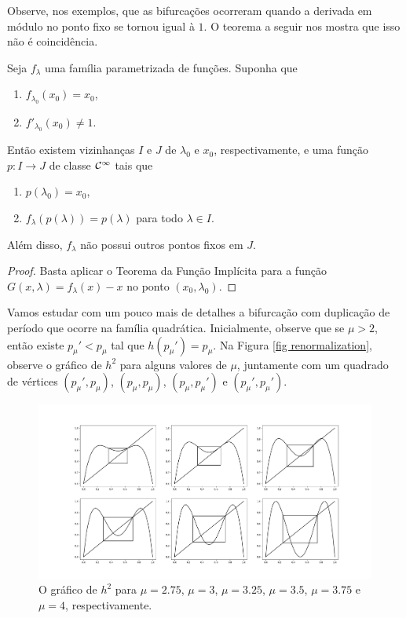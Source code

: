 Observe, nos exemplos, que as bifurcações ocorreram quando a derivada em módulo no ponto fixo se tornou igual à $1$. O teorema a seguir nos mostra que isso não é coincidência.

\begin{theorem}
\label{theorem1}
Seja $f_\lambda$ uma família parametrizada de funções.
Suponha que
\begin{enumerate}
\item $f_{\lambda_0}(x_0) = x_0$,
\item $f'_{\lambda_0}(x_0) \neq 1$. 
\end{enumerate}
Então existem vizinhanças $I$ e $J$ de $\lambda_0$ e $x_0$, respectivamente, e uma função $p: I \to J$ de classe $\mathcal{C}^\infty$ tais que
\begin{enumerate}
\item $p(\lambda_0) = x_0$, 
\item $f_\lambda(p(\lambda)) = p(\lambda)$ para todo $\lambda \in I$.
\end{enumerate}
Além disso, $f_\lambda$ não possui outros pontos fixos em $J$.
\end{theorem}

\begin{proof}
Basta aplicar o Teorema da Função Implícita para a função $G(x, \lambda) = f_\lambda(x) - x$ no ponto $(x_0, \lambda_0)$.
\end{proof}

Vamos estudar com um pouco mais de detalhes a bifurcação com duplicação de período que ocorre na família quadrática.
Inicialmente, observe que se $\mu > 2$, então existe $p_\mu' < p_\mu$ tal que $h(p_\mu') = p_\mu$.
Na Figura \ref{fig renormalization}, observe o gráfico de $h^2$ para alguns valores de $\mu$, juntamente com um quadrado de vértices $(p_\mu', p_\mu)$, $(p_\mu, p_\mu)$, $(p_\mu, p_\mu')$ e $(p_\mu', p_\mu')$.

\begin{figure}[!htb]
\label{fig h^2-and-boxes}
\centering
\includegraphics[scale=0.25]{images/h^2-and-boxes.png}
\caption{O gráfico de $h^2$ para $\mu = 2.75$, $\mu = 3$, $\mu = 3.25$, $\mu = 3.5$, $\mu = 3.75$ e $\mu = 4$, respectivamente.}
\end{figure}

